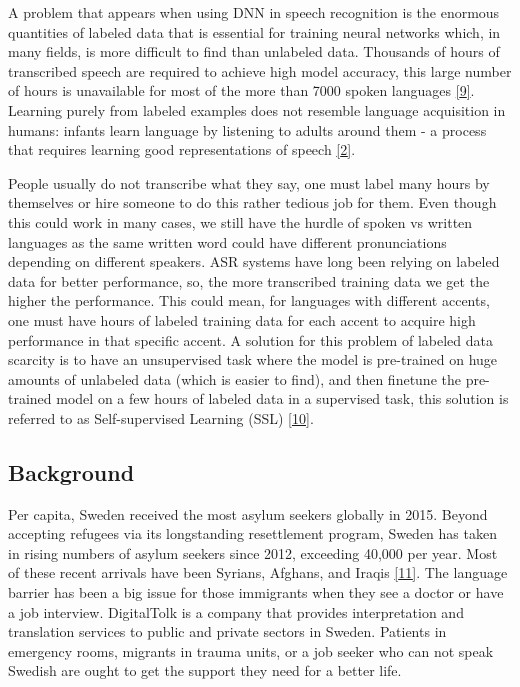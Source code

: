 \documentclass[
  a4paper,
]{article}
\begin{document}
A problem that appears when using DNN in speech recognition is the
enormous quantities of labeled data that is essential for training
neural networks which, in many fields, is more difficult to find than
unlabeled data. Thousands of hours of transcribed speech are required to
achieve high model accuracy, this large number of hours is unavailable
for most of the more than 7000 spoken languages
\protect\hyperlink{ref-Ethnologue}{{[}9{]}}. Learning purely from
labeled examples does not resemble language acquisition in humans:
infants learn language by listening to adults around them - a process
that requires learning good representations of speech
\protect\hyperlink{ref-2020arXiv200611477B}{{[}2{]}}.

People usually do not transcribe what they say, one must label many
hours by themselves or hire someone to do this rather tedious job for
them. Even though this could work in many cases, we still have the
hurdle of spoken vs written languages as the same written word could
have different pronunciations depending on different speakers. ASR
systems have long been relying on labeled data for better performance,
so, the more transcribed training data we get the higher the
performance. This could mean, for languages with different accents, one
must have hours of labeled training data for each accent to acquire high
performance in that specific accent. A solution for this problem of
labeled data scarcity is to have an unsupervised task where the model is
pre-trained on huge amounts of unlabeled data (which is easier to find),
and then finetune the pre-trained model on a few hours of labeled data
in a supervised task, this solution is referred to as Self-supervised
Learning (SSL) \protect\hyperlink{ref-baevski2020vqwav2vec}{{[}10{]}}.

\newpage

\hypertarget{background}{%
\subsection{Background}\label{background}}

Per capita, Sweden received the most asylum seekers globally in 2015.
Beyond accepting refugees via its longstanding resettlement program,
Sweden has taken in rising numbers of asylum seekers since 2012,
exceeding 40,000 per year. Most of these recent arrivals have been
Syrians, Afghans, and Iraqis
\protect\hyperlink{ref-migrationpolicy}{{[}11{]}}. The language barrier
has been a big issue for those immigrants when they see a doctor or have
a job interview. DigitalTolk is a company that provides interpretation
and translation services to public and private sectors in Sweden.
Patients in emergency rooms, migrants in trauma units, or a job seeker
who can not speak Swedish are ought to get the support they need for a
better life.
\end{document}
